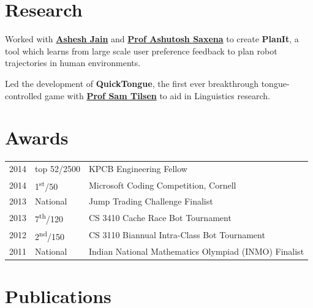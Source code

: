 \documentclass[]{deedy-resume-openfont}
\begin{document}
\begin{minipage}[t]{0.66\textwidth}

\section{Research}
Worked with \textbf{\href{http://www.cs.cornell.edu/~ashesh/}{Ashesh Jain}} and \textbf{\href{http://www.cs.cornell.edu/~asaxena/}{Prof Ashutosh Saxena}} to create \textbf{PlanIt}, a tool which  learns from large scale user preference feedback to plan robot trajectories in human environments.
\sectionsep

Led the development of \textbf{QuickTongue}, the first ever breakthrough tongue-controlled game with \textbf{\href{http://conf.ling.cornell.edu/~tilsen/}{Prof Sam Tilsen}} to aid in Linguistics research.
\sectionsep


\section{Awards}
\begin{tabular}{rll}
2014	     & top 52/2500  & KPCB Engineering Fellow\\
2014	     & 1\textsuperscript{st}/50  & Microsoft Coding Competition, Cornell\\
2013	     & National  & Jump Trading Challenge Finalist\\
2013     & 7\textsuperscript{th}/120 & CS 3410 Cache Race Bot Tournament  \\
2012     & 2\textsuperscript{nd}/150 & CS 3110 Biannual Intra-Class Bot Tournament \\
2011     & National & Indian National Mathematics Olympiad (INMO) Finalist \\
\end{tabular}
\sectionsep


\section{Publications}
\renewcommand\refname{\vskip -1.5cm} %


\nocite{*}

\end{minipage}
\end{document}
